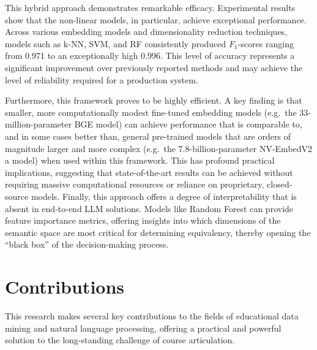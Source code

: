 \begin{introduction}
This hybrid approach demonstrates remarkable efficacy. Experimental results show that the non-linear models, in particular, achieve exceptional performance. Across various embedding models and dimensionality reduction techniques, models such as k-NN, SVM, and RF consistently produced \(F_1\)-scores ranging from 0.971 to an exceptionally high 0.996. This level of accuracy represents a significant improvement over previously reported methods and may achieve the level of reliability required for a production system.

Furthermore, this framework proves to be highly efficient. A key finding is that smaller, more computationally modest fine-tuned embedding models (e.g.\ the 33-million-parameter BGE model) can achieve performance that is comparable to, and in some cases better than, general pre-trained models that are orders of magnitude larger and more complex (e.g.\ the 7.8-billion-parameter NV-EmbedV2 a model) when used within this framework.  This has profound practical implications, suggesting that state-of-the-art results can be achieved without requiring massive computational resources or reliance on proprietary, closed-source models. Finally, this approach offers a degree of interpretability that is absent in end-to-end LLM solutions. Models like Random Forest can provide feature importance metrics, offering insights into which dimensions of the semantic space are most critical for determining equivalency, thereby opening the ``black box'' of the decision-making process.

\section{Contributions}
This research makes several key contributions to the fields of educational data mining and natural language processing, offering a practical and powerful solution to the long-standing challenge of course articulation.


\end{introduction}
